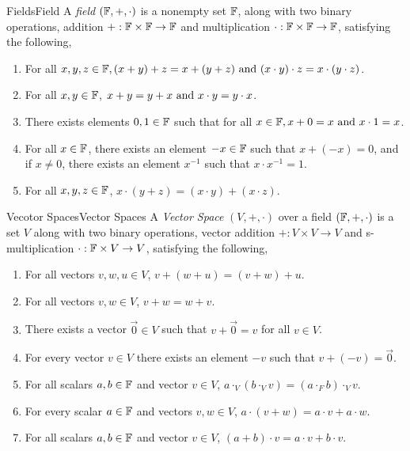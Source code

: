 \documentclass{article}
\begin{document}
\begin{definition}{Fields}{Field}
    A \emph{field} $\left(\mathbb{F}, +, \cdot\right)$ is a nonempty set $\mathbb{F}$, along with two binary operations,
    addition $+: \mathbb{F} \times \mathbb{F} \rightarrow \mathbb{F}$
    and multiplication $\cdot: \mathbb{F} \times \mathbb{F} \rightarrow \mathbb{F}$,
    satisfying the following,

    \begin{enumerate}[label=(\roman*)]
        \item  For all $x, y, z \in \mathbb{F}, (x + y) + z = x + (y + z) \text{ and } (x \cdot y) \cdot z = x \cdot (y \cdot z)$.
        \item  For all $x, y \in \mathbb{F}$, $x + y = y + x \text{ and } x \cdot y = y \cdot x$.
        \item  There exists elements $0, 1 \in \mathbb{F}$ such that for all $x \in \mathbb{F}, x + 0 = x \text{ and } x \cdot 1 = x$.
        \item  For all $x \in \mathbb{F}$, there exists an element $-x \in \mathbb{F}$ such that $x + (-x) = 0$, and if $x \neq 0$, there exists an element $x^{-1}$ such that $x \cdot x^{-1} = 1$.
        \item  For all $x, y, z \in \mathbb{F}$, $x \cdot (y + z) = (x \cdot y) + (x \cdot z)$.
    \end{enumerate}
\end{definition}

\begin{definition}{Vecotor Spaces}{Vector Spaces}
    A \emph{Vector Space} $\left(V, +, \cdot\right)$ over a field $\left(\mathbb{F}, +, \cdot\right)$ is a set $V$ along with two binary operations,
    vector addition $+: V \times V \rightarrow V$
    and s-multiplication $\cdot: \mathbb{F} \times V \rightarrow V$,
    satisfying the following,

    \begin{enumerate}[label=(\roman*)]
        \item  For all vectors $v, w, u \in V$, $v + (w + u) = (v + w) + u$.
        \item  For all vectors $v, w \in V$, $v + w = w + v$.
        \item  There exists a vector $\vec{0} \in V$ such that $v + \vec{0} = v$ for all $v \in V$.
        \item  For every vector $v \in V$ there exists an element $-v$ such that $v + (-v) = \vec{0}$.
        \item  For all scalars $a, b \in \mathbb{F}$ and vector $v \in V$, $a \cdot_V (b \cdot_V v) = (a \cdot_F b) \cdot_V v$.
        \item  For every scalar $a \in \mathbb{F}$ and vectors $v, w \in V$, $a \cdot (v + w) = a \cdot v + a \cdot w$.
        \item  For all scalars $a, b \in \mathbb{F}$ and vector $v\in V$, $(a + b) \cdot v = a \cdot v + b \cdot v$.
    \end{enumerate}
\end{definition}
\end{document}

